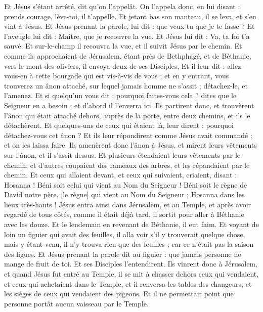 \begin{multicols}{2}
Et Jésus s'étant arrêté, dit qu'on l'appelât. On l'appela donc, en lui disant : prends courage, lève-toi, il t'appelle.
Et jetant bas son manteau, il se leva, et s'en vint à Jésus.
Et Jésus prenant la parole, lui dit : que veux-tu que je te fasse ? Et l'aveugle lui dit : Maître, que je recouvre la vue.
Et Jésus lui dit : Va, ta foi t'a sauvé.
Et sur-le-champ il recouvra la vue, et il suivit Jésus par le chemin.
\VerseOne{}Et comme ils approchaient de Jérusalem, étant près de Bethphagé, et de Béthanie, vers le mont des oliviers, il envoya deux de ses Disciples,
Et il leur dit : allez-vous-en à cette bourgade qui est vis-à-vis de vous ; et en y entrant, vous trouverez un ânon attaché, sur lequel jamais homme ne s'assit ; détachez-le, et l'amenez.
Et si quelqu'un vous dit : pourquoi faites-vous cela ? dites que le Seigneur en a besoin ; et d'abord il l'enverra ici.
Ils partirent donc, et trouvèrent l'ânon qui était attaché dehors, auprès de la porte, entre deux chemins, et ils le détachèrent.
Et quelques-uns de ceux qui étaient là, leur dirent : pourquoi détachez-vous cet ânon ?
Et ils leur répondirent comme Jésus avait commandé ; et on les laissa faire.
Ils amenèrent donc l'ânon à Jésus, et mirent leurs vêtements sur l'ânon, et il s'assit dessus.
Et plusieurs étendaient leurs vêtements par le chemin, et d'autres coupaient des rameaux des arbres, et les répandaient par le chemin.
Et ceux qui allaient devant, et ceux qui suivaient, criaient, disant : Hosanna ! Béni soit celui qui vient au Nom du Seigneur !
Béni soit le règne de David notre père, [le règne] qui vient au Nom du Seigneur ; Hosanna dans les lieux très-hauts !
Jésus entra ainsi dans Jérusalem, et au Temple, et après avoir regardé de tous côtés, comme il était déjà tard, il sortit pour aller à Béthanie avec les douze.
Et le lendemain en revenant de Béthanie, il eut faim.
Et voyant de loin un figuier qui avait des feuilles, il alla voir s'il y trouverait quelque chose, mais y étant venu, il n'y trouva rien que des feuilles ; car ce n'était pas la saison des figues.
Et Jésus prenant la parole dit au figuier : que jamais personne ne mange de fruit de toi. Et ses Disciples l'entendirent.
Ils vinrent donc à Jérusalem, et quand Jésus fut entré au Temple, il se mit à chasser dehors ceux qui vendaient, et ceux qui achetaient dans le Temple, et il renversa les tables des changeurs, et les sièges de ceux qui vendaient des pigeons.
Et il ne permettait point que personne portât aucun vaisseau par le Temple.

\end{multicols}
